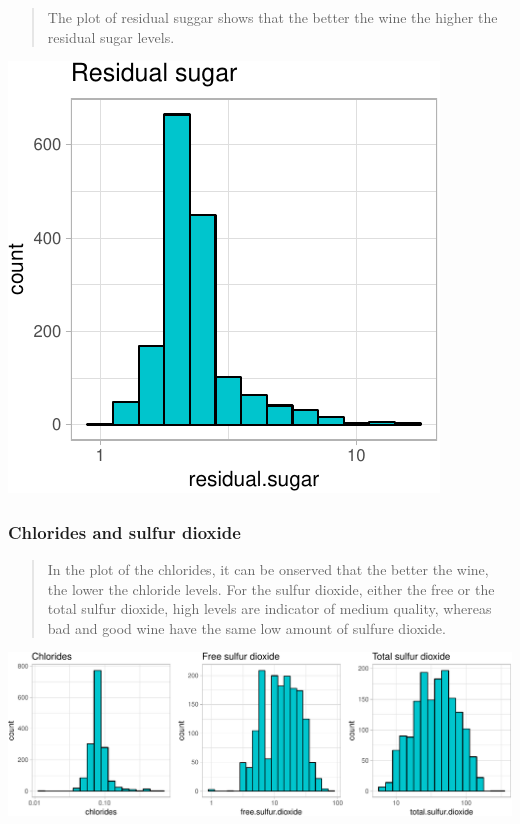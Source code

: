 \documentclass[]{article}
\begin{document}
\begin{quote}
The plot of residual suggar shows that the better the wine the higher
the residual sugar levels.
\end{quote}

\includegraphics{Figs/Univariate_Plots_residual_sugar-1.pdf}

\subsubsection{Chlorides and sulfur
dioxide}\label{chlorides-and-sulfur-dioxide}

\begin{quote}
In the plot of the chlorides, it can be onserved that the better the
wine, the lower the chloride levels. For the sulfur dioxide, either the
free or the total sulfur dioxide, high levels are indicator of medium
quality, whereas bad and good wine have the same low amount of sulfure
dioxide.
\end{quote}

\includegraphics{Figs/Univariate_Plots_chlorides-1.pdf}
\end{document}
